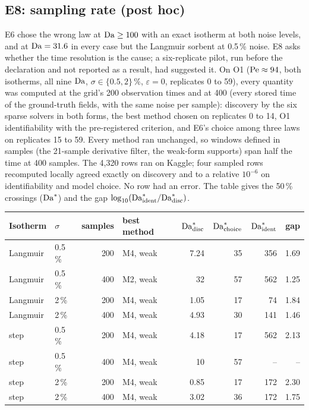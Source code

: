 \subsection*{E8: sampling rate (post hoc)}
E6 chose the wrong law at $\mathrm{Da} \ge 100$ with an exact isotherm at both noise levels, and at
$\mathrm{Da} = 31.6$ in every case but the Langmuir sorbent at 0.5\,\% noise. E8 asks whether the time resolution is the cause; a six-replicate pilot, run before the declaration and
not reported as a result, had suggested it. On O1 ($\mathrm{Pe} \approx 94$, both isotherms, all nine
$\mathrm{Da}$, $\sigma \in \{0.5, 2\}\,\%$, $\varepsilon = 0$, replicates 0 to 59), every quantity was
computed at the grid's 200 observation times and at 400 (every stored time of the ground-truth
fields, with the same noise per sample): discovery by the six sparse solvers in both forms, the
best method chosen on replicates 0 to 14, O1 identifiability with the pre-registered criterion,
and E6's choice among three laws on replicates 15 to 59. Every method ran unchanged, so windows
defined in samples (the 21-sample derivative filter, the weak-form supports) span half the time at
400 samples. The 4,320 rows ran on Kaggle; four sampled rows recomputed locally agreed exactly on
discovery and to a relative $10^{-6}$ on identifiability and model choice. No row had an error.
The table gives the 50\,\% crossings ($\mathrm{Da}^{*}$) and the gap $\log_{10}(\mathrm{Da}^{*}_{\mathrm{ident}} /
\mathrm{Da}^{*}_{\mathrm{disc}})$.
\begin{center}
\small
\begin{tabular}{@{}llrlrrrr@{}}
\toprule
Isotherm & $\sigma$ & samples & best method & $\mathrm{Da}^{*}_{\mathrm{disc}}$ & $\mathrm{Da}^{*}_{\mathrm{choice}}$ & $\mathrm{Da}^{*}_{\mathrm{ident}}$ & gap \\
\midrule
Langmuir & 0.5\,\% & 200 & M4, weak & 7.24 & 35 & 356 & 1.69 \\
Langmuir & 0.5\,\% & 400 & M2, weak & 32 & 57 & 562 & 1.25 \\
Langmuir & 2\,\% & 200 & M4, weak & 1.05 & 17 & 74 & 1.84 \\
Langmuir & 2\,\% & 400 & M4, weak & 4.93 & 30 & 141 & 1.46 \\
step & 0.5\,\% & 200 & M4, weak & 4.18 & 17 & 562 & 2.13 \\
step & 0.5\,\% & 400 & M4, weak & 10 & 57 & -- & -- \\
step & 2\,\% & 200 & M4, weak & 0.85 & 17 & 172 & 2.30 \\
step & 2\,\% & 400 & M4, weak & 3.02 & 36 & 172 & 1.75 \\
\bottomrule
\end{tabular}
\end{center}
